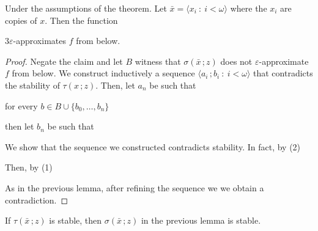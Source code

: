 \begin{lemma}
  Under the assumptions of the theorem. 
  Let $\bar x=\langle x_i\ :\ i<\omega\rangle$ where the $x_i$ are copies of $x$.
  Then the function\smallskip


  $3\varepsilon$-approximates $f$ from below.
\end{lemma}

\begin{proof}
  Negate the claim and let $B$ witness that $\sigma(\bar x\,;z)$ does not $\varepsilon$-approximate $f$ from below.
  We construct inductively a sequence $\langle a_i\,;b_i\ :\ i<\omega\rangle$ that contradicts the stability of $\tau(x\,;z)$.
  Then, let $a_n$ be such that

  \hfill for every $b\in B\cup\{b_0,\dots,b_n\}$

  then let $b_n$ be such that


  We show that the sequence we constructed contradicts stability.
  In fact, by (2)


  Then, by (1)


  As in the previous lemma, after refining the sequence we we obtain a contradiction.
\end{proof}

\begin{lemma}
  If $\tau(\bar x\,;z)$ is stable, then $\sigma(\bar x\,;z)$ in the previous lemma is stable. 
\end{lemma}

